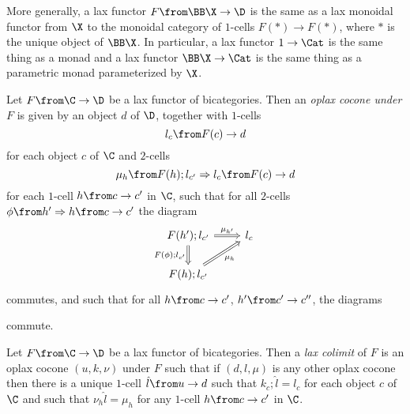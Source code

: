 \begin{example}
  More generally, a lax functor $F\from \BB \X \to \D$ is the same as a lax monoidal functor from $\X$ to the monoidal category of $1$-cells $F(*) \to F(*)$, where $*$ is the unique object of $\BB\X$.  
  In particular, a lax functor $1\to \Cat$ is the same thing as a monad and a lax functor $\BB\X \to \Cat$ is the same thing as a parametric monad parameterized by $\X$.
\end{example}

\begin{definition}
  Let $F \from \C \to \D$ be a lax functor of bicategories.  
  Then an \emph{oplax cocone under $F$} is given by an object $d$ of $\D$, together with $1$-cells
  \[
    l_c \from F(c) \to d
    \]
  for each object $c$ of $\C$ and $2$-cells
  \[
    \mu_h \from F(h);l_{c'} \Rightarrow l_c \from F(c) \to d
    \]
  for each $1$-cell $h\from c \to c'$ in $\C$, such that for all $2$-cells $\phi\from h' \Rightarrow h \from c \to c'$ the diagram
  \[
    \begin{tikzcd}
      F(h');l_{c'} \arrow[r, "\mu_{h'}", Rightarrow] \arrow[d, "F(\phi);l_{c'}"', Rightarrow]
        & l_c \\
      F(h);l_{c'} \arrow[ur, "\mu_h"', Rightarrow]
        &
    \end{tikzcd}
    \]
  commutes, and such that for all $h\from c \to c'$, $h' \from c' \to c''$, the diagrams
  commute.
\end{definition}

\begin{definition}
  Let $F \from \C \to \D$ be a lax functor of bicategories.  
  Then a \emph{lax colimit} of $F$ is an oplax cocone $(u,k,\nu)$ under $F$ such that if $(d,l,\mu)$ is any other oplax cocone then there is a unique $1$-cell $\hat{l} \from u \to d$ such that $k_c;\hat{l}=l_c$ for each object $c$ of $\C$ and such that $\nu_h\hat{l}=\mu_h$ for any $1$-cell $h\from c \to c'$ in $\C$.
\end{definition}


